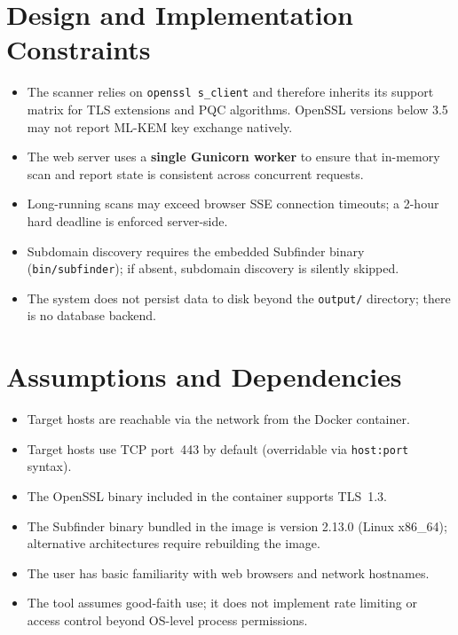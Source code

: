 \section{Design and Implementation Constraints}
\label{sec:design_constraints}

\begin{itemize}[noitemsep]
  \item The scanner relies on \texttt{openssl s\_client} and therefore inherits
        its support matrix for TLS extensions and PQC algorithms. OpenSSL
        versions below 3.5 may not report ML-KEM key exchange natively.
  \item The web server uses a \textbf{single Gunicorn worker} to ensure that
        in-memory scan and report state is consistent across concurrent requests.
  \item Long-running scans may exceed browser SSE connection timeouts; a 2-hour
        hard deadline is enforced server-side.
  \item Subdomain discovery requires the embedded Subfinder binary
        (\texttt{bin/subfinder}); if absent, subdomain discovery is silently
        skipped.
  \item The system does not persist data to disk beyond the \texttt{output/}
        directory; there is no database backend.
\end{itemize}

\section{Assumptions and Dependencies}
\label{sec:assumptions}

\begin{itemize}[noitemsep]
  \item Target hosts are reachable via the network from the Docker container.
  \item Target hosts use TCP port~443 by default (overridable via
        \texttt{host:port} syntax).
  \item The OpenSSL binary included in the container supports TLS~1.3.
  \item The Subfinder binary bundled in the image is version 2.13.0
        (Linux x86\_64); alternative architectures require rebuilding the image.
  \item The user has basic familiarity with web browsers and network hostnames.
  \item The tool assumes good-faith use; it does not implement rate limiting
        or access control beyond OS-level process permissions.
\end{itemize}
